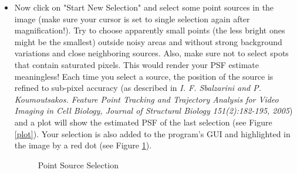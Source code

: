 \begin{itemize}
\item Now click on "Start New Selection" and select some point sources in the image (make sure your cursor is set to single selection again after magnification!). Try to choose apparently small points (the less bright ones might be the smallest) outside noisy areas and without strong background variations and close neighboring sources. Also, make sure not to select spots that contain saturated pixels. This would render your PSF estimate meaningless! Each time you select a source, the position of the source is refined to sub-pixel accuracy (as described in \textit{I. F. Sbalzarini and P. Koumoutsakos. Feature Point Tracking and Trajectory Analysis for Video Imaging in Cell Biology, Journal of Structural Biology 151(2):182-195, 2005}) and a plot will show the estimated PSF of the last selection (see Figure \ref{plot}). Your selection is also added to the program's GUI and highlighted in the image by a red dot (see Figure \ref{selection}).

\begin{figure}[h]
\caption{Point Source Selection}
\label{selection}
\end{figure} 
 

\end{itemize}
